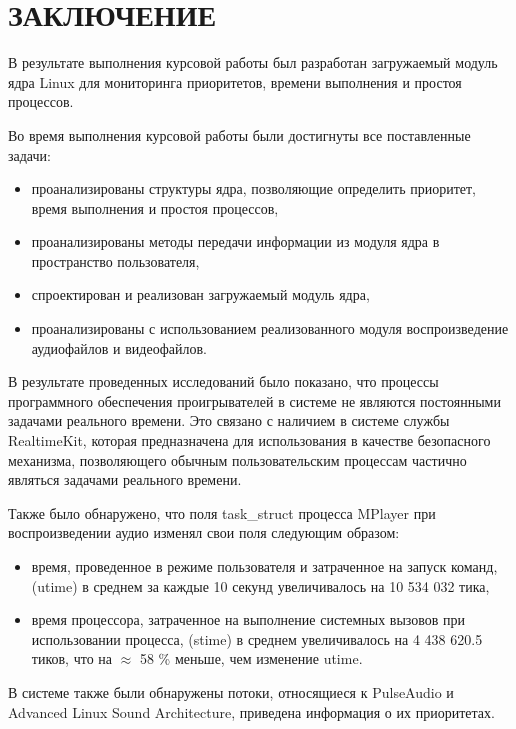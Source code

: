 \section*{ЗАКЛЮЧЕНИЕ}

В результате выполнения курсовой работы был разработан загружаемый модуль ядра Linux для мониторинга приоритетов, времени выполнения и простоя процессов.

Во время выполнения курсовой работы были достигнуты все поставленные задачи:
\begin{itemize}
\item проанализированы структуры ядра, позволяющие определить приоритет, время выполнения и простоя процессов,
\item проанализированы методы передачи информации из модуля ядра в пространство пользователя,
\item спроектирован и реализован загружаемый модуль ядра,
\item проанализированы с использованием реализованного модуля воспроизведение аудиофайлов и видеофайлов.
\end{itemize}

В результате проведенных исследований было показано, что процессы программного обеспечения проигрывателей в системе не являются постоянными задачами реального времени. Это связано с наличием в системе службы RealtimeKit, которая предназначена для использования в качестве безопасного механизма, позволяющего обычным пользовательским процессам частично являться задачами реального времени.

Также было обнаружено, что поля task\_struct процесса MPlayer при воспроизведении аудио изменял свои поля следующим образом:
\begin{itemize}
\item время, проведенное в режиме пользователя и затраченное на запуск команд, (utime) в среднем за каждые 10 секунд увеличивалось на 10 534 032 тика,
\item время процессора, затраченное на выполнение системных вызовов при использовании процесса, (stime) в среднем увеличивалось на 4 438 620.5 тиков, что на $\approx$ 58 \% меньше, чем изменение utime.
\end{itemize}

В системе также были обнаружены потоки, относящиеся к PulseAudio и Advanced Linux Sound Architecture, приведена информация о их приоритетах.

\pagebreak